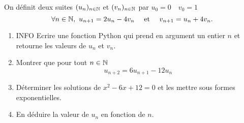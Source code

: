 \documentclass[a4paper, 11pt]{article}
\begin{document}
\begin{exercice} \;
On d\'efinit deux suites $(u_n)_{n\in\mathbb{N}}$ et $(v_n)_{n\in\mathbb{N}}$ par $u_0=0\quad v_0=1$
$$\forall n\in\N,\ u_{n+1}=2u_n-4v_n\quadet  v_{n+1}=u_n+4v_n.$$
\begin{enumerate}
    \item INFO Ecrire une fonction Python qui prend en argument un entier $n$ et retourne les valeurs de $u_n$ et $v_n$.
    \item Montrer que pour tout $n\in \mathbb{N}$ 
    $$u_{n+2} = 6u_{n+1}-12u_n$$
    \item Déterminer les solutions de $x^2-6x+12=0$ et les mettre sous formes exponentielles. 
    \item En déduire la valeur de $u_n$ en fonction de $n$.
\end{enumerate}

\end{exercice}
\end{document}
